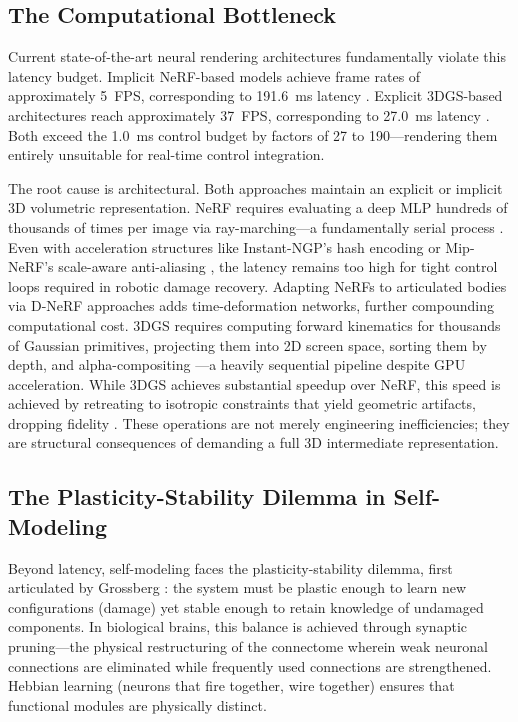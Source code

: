 \documentclass[12pt,a4paper,oneside]{report}
\begin{document}
\subsection{The Computational Bottleneck}
\label{subsec:computational_bottleneck}

Current state-of-the-art neural rendering architectures fundamentally violate this latency budget. Implicit NeRF-based models achieve frame rates of approximately 5~FPS, corresponding to 191.6~ms latency \cite{hu2024teaching}. Explicit 3DGS-based architectures reach approximately 37~FPS, corresponding to 27.0~ms latency \cite{hu2025learning}. Both exceed the 1.0~ms control budget by factors of 27 to 190---rendering them entirely unsuitable for real-time control integration.

The root cause is architectural. Both approaches maintain an explicit or implicit 3D volumetric representation. NeRF requires evaluating a deep MLP hundreds of thousands of times per image via ray-marching---a fundamentally serial process \cite{mildenhall2020nerf}. Even with acceleration structures like Instant-NGP's hash encoding \cite{muller2022instant} or Mip-NeRF's scale-aware anti-aliasing \cite{barron2021mip}, the latency remains too high for tight control loops required in robotic damage recovery. Adapting NeRFs to articulated bodies via D-NeRF approaches \cite{pumarola2021d} adds time-deformation networks, further compounding computational cost. 3DGS requires computing forward kinematics for thousands of Gaussian primitives, projecting them into 2D screen space, sorting them by depth, and alpha-compositing \cite{kerbl20233d}---a heavily sequential pipeline despite GPU acceleration. While 3DGS achieves substantial speedup over NeRF, this speed is achieved by retreating to isotropic constraints that yield geometric artifacts, dropping fidelity \cite{hu2025learning}. These operations are not merely engineering inefficiencies; they are structural consequences of demanding a full 3D intermediate representation.
\subsection{The Plasticity-Stability Dilemma in Self-Modeling}
\label{subsec:plasticity_stability}

Beyond latency, self-modeling faces the plasticity-stability dilemma, first articulated by Grossberg \cite{grossberg1987competitive}: the system must be plastic enough to learn new configurations (damage) yet stable enough to retain knowledge of undamaged components. In biological brains, this balance is achieved through synaptic pruning---the physical restructuring of the connectome wherein weak neuronal connections are eliminated while frequently used connections are strengthened. Hebbian learning (neurons that fire together, wire together) ensures that functional modules are physically distinct.
\end{document}
